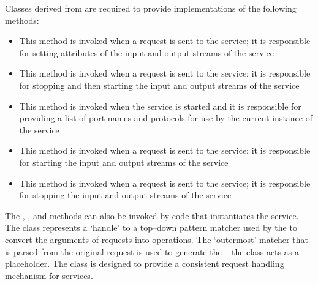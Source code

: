 Classes derived from  are
required to provide implementations of the following methods:
\begin{itemize}
\item \textbf{} This method is invoked when a
 request is sent to the service; it
is responsible for setting attributes of the input and output streams of the service
\item \textbf{} This method is invoked when a
 request is sent to the
service; it is responsible for stopping and then starting the input and output streams of
the service
\item \textbf{} This method is invoked when the service is
started and it is responsible for providing a list of port names and protocols for use by
the current instance of the service
\item \textbf{} This method is invoked when a
 request is sent to the service;
it is responsible for starting the input and output streams of the service
\item \textbf{} This method is invoked when a
 request is sent to the service;
it is responsible for stopping the input and output streams of the service
\end{itemize}
The , ,  and
 methods can also be invoked by code that instantiates the service.
\secondaryEnd{}
The  class represents a `handle' to a top--down
pattern matcher used by the  to convert
the arguments of  requests into
 operations.
The `outermost' matcher that is parsed from the original request is used to generate the
 -- the  class acts as a placeholder.
\secondaryEnd{}
\newpage
{}
The  class is designed to provide a
consistent request handling mechanism for \mplusm{} services.\\


